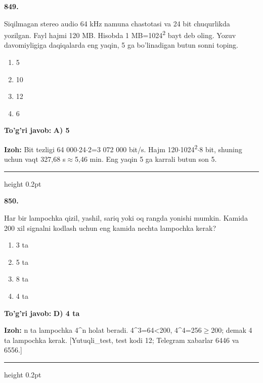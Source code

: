 \documentclass[10pt,a4paper,oneside]{article}
\begin{document}
\noindent\textbf{\color{ink}849.}
\par
Siqilmagan stereo audio 64 kHz namuna chastotasi va 24 bit chuqurlikda yozilgan. Fayl hajmi 120 MB. Hisobda 1 MB=1024\textsuperscript{2} bayt deb oling. Yozuv davomiyligiga daqiqalarda eng yaqin, 5 ga bo'linadigan butun sonni toping.
\begin{enumerate}[label=\Alph*),leftmargin=9mm]
\item 5
\item 10
\item 12
\item 6
\end{enumerate}
\begin{tcolorbox}[enhanced,breakable,colback=teal!4,colframe=teal!50!black,boxrule=0.5pt,arc=1.1mm,left=3mm,right=3mm,top=1.7mm,bottom=1.7mm,before skip=2mm,after skip=2mm]
\textbf{\color{teal}To'g'ri javob:} \textbf{A) 5}
\par\smallskip
\textbf{Izoh:} Bit tezligi 64 000\ensuremath{\cdot}24\ensuremath{\cdot}2=3 072 000 bit/s. Hajm 120\ensuremath{\cdot}1024\textsuperscript{2}\ensuremath{\cdot}8 bit, shuning uchun vaqt 327,68 s\ensuremath{\approx}5,46 min. Eng yaqin 5 ga karrali butun son 5.
\end{tcolorbox}
\vspace{2mm}\hrule height 0.2pt \vspace{3mm}

\noindent\textbf{\color{ink}850.}
\par
Har bir lampochka qizil, yashil, sariq yoki oq rangda yonishi mumkin. Kamida 200 xil signalni kodlash uchun eng kamida nechta lampochka kerak?
\begin{enumerate}[label=\Alph*),leftmargin=9mm]
\item 3 ta
\item 5 ta
\item 8 ta
\item 4 ta
\end{enumerate}
\begin{tcolorbox}[enhanced,breakable,colback=teal!4,colframe=teal!50!black,boxrule=0.5pt,arc=1.1mm,left=3mm,right=3mm,top=1.7mm,bottom=1.7mm,before skip=2mm,after skip=2mm]
\textbf{\color{teal}To'g'ri javob:} \textbf{D) 4 ta}
\par\smallskip
\textbf{Izoh:} n ta lampochka 4\textasciicircum{}n holat beradi. 4\textasciicircum{}3=64\textless{}200, 4\textasciicircum{}4=256\ensuremath{\geq}200; demak 4 ta lampochka kerak. [Yutuqli\_test, test kodi 12; Telegram xabarlar 6446 va 6556.]
\end{tcolorbox}
\vspace{2mm}\hrule height 0.2pt \vspace{3mm}
\end{document}
